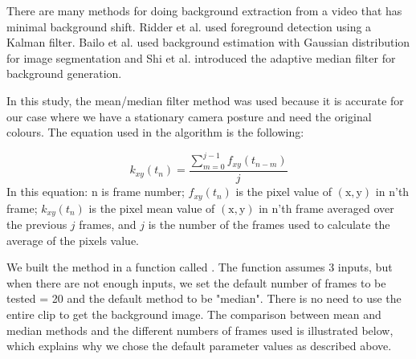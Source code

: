 \documentclass[12pt]{article}
\begin{document}
There are many methods for doing background extraction from a video that has minimal background shift. Ridder et al. \cite{Ridder1995AdaptiveBE} used foreground detection using a Kalman filter. Bailo et al. \cite{bailo2005} used background estimation with Gaussian distribution for image
segmentation and Shi et al. \cite{shi2002adaptive} introduced the adaptive median filter for background generation.

In this study, the mean/median filter method was
used because it is accurate for our case where we have a stationary camera posture and need the original colours. The equation used in the algorithm is the following\cite{rad2010vehicle}:

$$
k_{x y}\left(t_n\right)=\frac{\sum_{m=0}^{j-1} f_{x y}\left(t_{n-m}\right)}{j}
$$
In this equation: $\mathrm{n}$ is frame number; $f_{x y}\left(t_n\right)$ is the pixel value of $(\mathrm{x}, \mathrm{y})$ in n'th frame; $k_{x y}\left(t_n\right)$ is the pixel mean value of $(\mathrm{x}, \mathrm{y})$ in n'th frame averaged over the previous $j$ frames, and $j$ is the number of the frames used to calculate the average of the pixels value.

We built the method in a function called . The function assumes 3 inputs, but when there are not enough inputs, we set the default number of frames to be tested = 20 and the default method to be "median". There is no need to use the entire clip to get the background image. The comparison between mean and median methods and the different numbers of frames used is illustrated below, which explains why we chose the default parameter values as described above.
\end{document}
